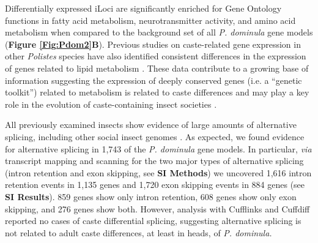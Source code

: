 Differentially expressed iLoci are significantly enriched for Gene
Ontology functions in fatty acid metabolism, neurotransmitter activity,
and amino acid metabolism when compared to the background set of all
\textit{P. dominula} gene models (\textbf{Figure \ref{Fig:Pdom2}B}). Previous studies on
caste-related gene expression in other \textit{Polistes} species have also
identified consistent differences in the expression of genes related to
lipid metabolism \cite{Berens2015,Sumner2006,Toth2010}.
These data contribute to a growing base of information suggesting the
expression of deeply conserved genes (i.e. a ``genetic toolkit'')
related to metabolism is related to caste differences and may play a key
role in the evolution of caste-containing insect societies \cite{TothRobinson2007}.

All previously examined insects show evidence of large amounts of
alternative splicing, including other social insect genomes \cite{Flores2012,Dnmt3KD}. As
expected, we found evidence for alternative splicing in 1,743 of the
\textit{P. dominula} gene models. In particular, \textit{via} transcript
mapping and scanning for the two major types of alternative splicing
(intron retention and exon skipping, see \textbf{SI Methods}) we
uncovered 1,616 intron retention events in 1,135 genes and 1,720 exon
skipping events in 884 genes (see \textbf{SI Results}). 859 genes show
only intron retention, 608 genes show only exon skipping, and 276 genes
show both. However, analysis with Cufflinks and Cuffdiff \cite{Cuffdiff} reported no cases of caste differential splicing, suggesting
alternative splicing is not related to adult caste differences, at least
in heads, of \textit{P. dominula.}

